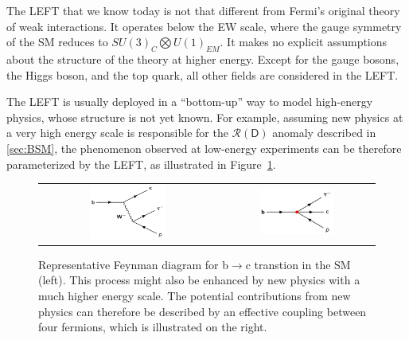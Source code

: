 The \ac{LEFT} that we know today is not that different from Fermi's original theory of weak interactions. It operates below the \ac{EW} scale, where the gauge symmetry of the \ac{SM} reduces to $SU(3)_{C}\bigotimes U(1)_{EM}$. It makes no explicit assumptions about the structure of the theory at higher energy. Except for the gauge bosons, the Higgs boson, and the top quark, all other fields are considered in the \ac{LEFT}. 

The \ac{LEFT} is usually deployed in a ``bottom-up'' way to model high-energy physics, whose structure is not yet known. For example, assuming new physics at a very high energy scale is responsible for the $\mathcal{R}(\textsf{D})$ anomaly described in \autoref{sec:BSM}, the phenomenon observed at low-energy experiments can be therefore parameterized by the \ac{LEFT}, as illustrated in Figure~\ref{fig:LEFT}.

\begin{figure}[tbh!]
 \begin{center}
 \begin{tabular}{cc}
 \includegraphics[width=0.45\textwidth]{figures/Part1/BSM/SMbtoc}&
 \includegraphics[width=0.5\textwidth]{figures/Part1/EFT/LEFT}
 \end{tabular}
 \caption{Representative Feynman diagram for b$\rightarrow$c transtion in the \ac{SM} (left). This process might also be enhanced by new physics with a much higher energy scale. The potential contributions from new physics can therefore be described by an effective coupling between four fermions, which is illustrated on the right.}
 \label{fig:LEFT}
 \end{center}
\end{figure}

